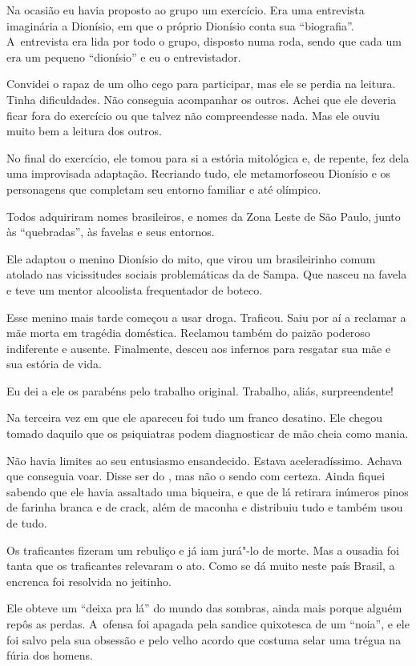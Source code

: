 Na ocasião eu havia proposto ao grupo um exercício. Era uma entrevista
imaginária a Dionísio, em que o próprio Dionísio conta sua
``biografia''. A~entrevista era lida por todo o grupo, disposto numa
roda, sendo que cada um era um pequeno ``dionísio'' e eu o
entrevistador.

Convidei o rapaz de um olho cego para participar, mas ele se perdia na
leitura. Tinha dificuldades. Não conseguia acompanhar os outros. Achei
que ele deveria ficar fora do exercício ou que talvez não compreendesse
nada. Mas ele ouviu muito bem a leitura dos outros.

No final do exercício, ele tomou para si a estória mitológica e, de
repente, fez dela uma improvisada adaptação. Recriando tudo, ele
metamorfoseou Dionísio e os personagens que completam seu entorno
familiar e até olímpico.

Todos adquiriram nomes brasileiros, e nomes da Zona Leste de São Paulo,
junto às ``quebradas'', às favelas e seus entornos.

Ele adaptou o menino Dionísio do mito, que virou um brasileirinho comum
atolado nas vicissitudes sociais problemáticas da  de Sampa. Que
nasceu na favela e teve um mentor alcoolista frequentador de boteco.

Esse menino mais tarde começou a usar droga. Traficou. Saiu por aí a
reclamar a mãe morta em tragédia doméstica. Reclamou também do paizão
poderoso indiferente e ausente. Finalmente, desceu aos infernos para
resgatar sua mãe e sua estória de vida.

Eu dei a ele os parabéns pelo trabalho original. Trabalho, aliás,
surpreendente!

\asterisc{}

Na terceira vez em que ele apareceu foi tudo um franco desatino. Ele
chegou tomado daquilo que os psiquiatras podem diagnosticar de mão cheia
como mania.

Não havia limites ao seu entusiasmo ensandecido. Estava aceleradíssimo.
Achava que conseguia voar. Disse ser do , mas não o sendo com
certeza. Ainda fiquei sabendo que ele havia assaltado uma biqueira, e
que de lá retirara inúmeros pinos de farinha branca e de crack, além de
maconha e distribuiu tudo e também usou de tudo.

Os traficantes fizeram um rebuliço e já iam jurá"-lo de morte. Mas a
ousadia foi tanta que os traficantes relevaram o ato. Como se dá muito
neste país Brasil, a encrenca foi resolvida no jeitinho.

Ele obteve um ``deixa pra lá'' do mundo das sombras, ainda mais porque
alguém repôs as perdas. A~ofensa foi apagada pela sandice quixotesca de
um ``noia'', e ele foi salvo pela sua obsessão e pelo velho acordo que
costuma selar uma trégua na fúria dos homens.

